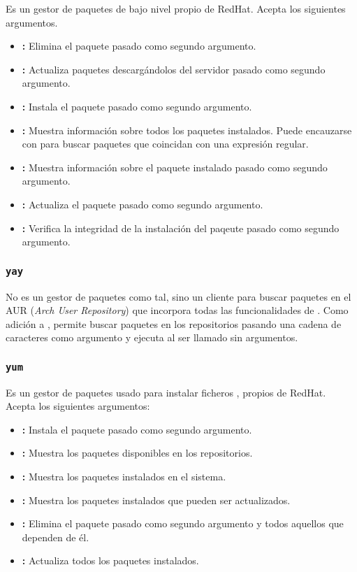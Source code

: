 Es un gestor de paquetes de bajo nivel propio de RedHat.
Acepta los siguientes argumentos.

\begin{itemize}
	\item{}\textbf{:} Elimina el paquete pasado como segundo argumento.
	\item{}\textbf{:} Actualiza paquetes descargándolos del servidor pasado como segundo argumento.
	\item{}\textbf{:} Instala el paquete pasado como segundo argumento.
	\item{}\textbf{:} Muestra información sobre todos los paquetes instalados. Puede encauzarse con  para buscar paquetes que coincidan con una expresión regular.
	\item{}\textbf{:} Muestra información sobre el paquete instalado pasado como segundo argumento.
	\item{}\textbf{:} Actualiza el paquete pasado como segundo argumento.
	\item{}\textbf{:} Verifica la integridad de la instalación del paqeute pasado como segundo argumento.
\end{itemize}

\subsubsection{\texttt{yay}}

No es un gestor de paquetes como tal, sino un cliente para buscar paquetes en el AUR (\emph{Arch User Repository}) que incorpora todas las funcionalidades de .
Como adición a , permite buscar paquetes en los repositorios pasando una cadena de caracteres como argumento y ejecuta  al ser llamado sin argumentos.

\subsubsection{\texttt{yum}}

Es un gestor de paquetes usado para instalar ficheros , propios de RedHat.
Acepta los siguientes argumentos:

\begin{itemize}
	\item{}\textbf{:} Instala el paquete pasado como segundo argumento.
	\item{}\textbf{:} Muestra los paquetes disponibles en los repositorios.
	\item{}\textbf{:} Muestra los paquetes instalados en el sistema.
	\item{}\textbf{:} Muestra los paquetes instalados que pueden ser actualizados.
	\item{}\textbf{:} Elimina el paquete pasado como segundo argumento y todos aquellos que dependen de él.
	\item{}\textbf{:} Actualiza todos los paquetes instalados.
\end{itemize}

